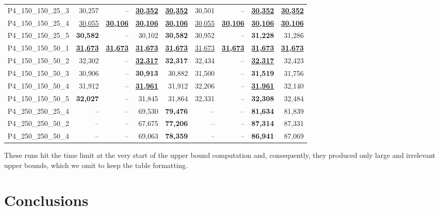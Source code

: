 \documentclass[smallextended]{svjour3}       %
\begin{document}
\begin{table}
\begin{tabular}{lrrrrrrrr}
P4\_150\_150\_25\_3 & 30,257 & -- & \underline{\textbf{30,352}} & \underline{\textbf{30,352}} & 30,501 & -- & \underline{\textbf{30,352}} & \underline{\textbf{30,352}} \\
P4\_150\_150\_25\_4 & \underline{30,055} & \underline{\textbf{30,106}} & \underline{\textbf{30,106}} & \underline{\textbf{30,106}} & \underline{30,055} & \underline{\textbf{30,106}} & \underline{\textbf{30,106}} & \underline{\textbf{30,106}} \\
P4\_150\_150\_25\_5 & \textbf{30,582} & -- & 30,102 & \textbf{30,582} & 30,952 & -- & \textbf{31,228} & 31,286 \\
P4\_150\_150\_50\_1 & \underline{\textbf{31,673}} & \underline{\textbf{31,673}} & \underline{\textbf{31,673}} & \underline{\textbf{31,673}} & \underline{31,673} & \underline{\textbf{31,673}} & \underline{\textbf{31,673}} & \underline{\textbf{31,673}} \\
P4\_150\_150\_50\_2 & 32,302 & -- & \underline{\textbf{32,317}} & \textbf{32,317} & 32,434 & -- & \underline{\textbf{32,317}} & 32,423 \\
P4\_150\_150\_50\_3 & 30,906 & -- & \textbf{30,913} & 30,882 & 31,500 & -- & \textbf{31,519} & 31,756 \\
P4\_150\_150\_50\_4 & 31,912 & -- & \underline{\textbf{31,961}} & 31,912 & 32,206 & -- & \underline{\textbf{31,961}} & 32,140 \\
P4\_150\_150\_50\_5 & \textbf{32,027} & -- & 31,845 & 31,864 & 32,331 & -- & \textbf{32,308} & 32,484 \\
P4\_250\_250\_25\_4 & -- & -- & 69,530 & \textbf{79,476} & -- & -- & \textbf{81,634} & 81,839 \\
P4\_250\_250\_50\_2 & -- & -- & 67,675 & \textbf{77,206} & -- & -- & \textbf{87,314} & 87,331 \\
P4\_250\_250\_50\_4 & -- & -- & 69,063 & \textbf{78,359} & -- & -- & \textbf{86,941} & 87,069 \\\hline\hline
\end{tabular}
\textbf{\large \textasteriskcentered} These runs hit the time limit at the very start of the upper bound computation and, consequently, they produced only large and irrelevant upper bounds, which we omit to keep the table formatting.
\label{tab:velasco_new_results}
\end{table}

\section{Conclusions}
\label{sec:conclusions}
\end{document}
